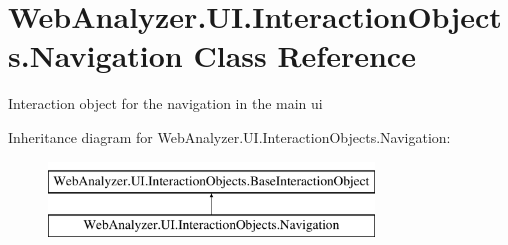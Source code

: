\hypertarget{class_web_analyzer_1_1_u_i_1_1_interaction_objects_1_1_navigation}{}\section{Web\+Analyzer.\+U\+I.\+Interaction\+Objects.\+Navigation Class Reference}
\label{class_web_analyzer_1_1_u_i_1_1_interaction_objects_1_1_navigation}


Interaction object for the navigation in the main ui  


Inheritance diagram for Web\+Analyzer.\+U\+I.\+Interaction\+Objects.\+Navigation\+:\begin{figure}[H]
\begin{center}
\leavevmode
\includegraphics[height=2.000000cm]{class_web_analyzer_1_1_u_i_1_1_interaction_objects_1_1_navigation}
\end{center}
\end{figure}
